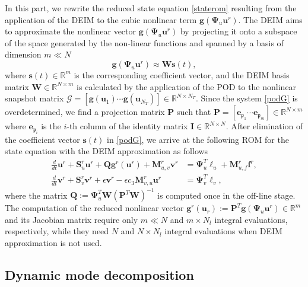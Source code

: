 \documentclass[preprint,12pt]{elsarticle}
\begin{document}
In this part, we rewrite the reduced state equation \eqref{staterom} resulting from the application of the DEIM \cite{chaturantabut10nmr} to the cubic nonlinear term $ \bm{g}(\bm{\Psi}_u \bm{u}^r)$.
The DEIM aims to approximate the nonlinear vector $ \bm{g}(\bm{\Psi}_u \bm{u}^r)$ by projecting it onto a subspace of the space generated by the non-linear functions and spanned by a basis of dimension $m\ll N$
\begin{equation}\label{podG}
 \bm{g}(\bm{\Psi}_u \bm{u}^r) \approx \bm{W}\bm{s}(t),
\end{equation}
where $\bm{s}(t)\in\mathbb{R}^m$ is the corresponding coefficient vector, and the DEIM basis matrix $\bm{W}\in\mathbb{R}^{N\times m}$ is calculated by the application of the POD to the nonlinear snapshot matrix $\mathcal{G}=[\bm{g}(\bm{u}_1) \cdots  \bm{g}(\bm{u}_{N_T})]\in\mathbb{R}^{N\times N_T}$. Since the system \eqref{podG} is overdetermined, we find a projection matrix $\bm{P}$ such that $\bm{P}=[\bm{e}_{\mathfrak{p}_1} \cdots  \bm{e}_{\mathfrak{p}_m}]\in\mathbb{R}^{N\times m}$ where $\bm{e}_{\mathfrak{p}_i}$ is the $i$-th column of the identity matrix $\bm{I}\in\mathbb{R}^{N\times N}$. After elimination of the coefficient vector $\bm{s}(t)$ in \eqref{podG}, we arrive at the following ROM for the state equation with the DEIM approximation as follows
\begin{equation}\label{statedeim}
\begin{aligned}
  \frac{d}{dt} \bm{u}^r +  \bm{S}^r_u \bm{u}^r   + \bm{Q}\bm{g}^r(\bm{u}^r)
  + \bm{M}_{u,v}^r \bm{v}^r  &=  \bm{\Psi}_u^T \bm{\ell}_u + \bm{M}_{u,f}^r \bm{f}^r, \\
 \frac{d}{dt} \bm{v}^r +  \bm{S}^r_v \bm{v}^r  + \epsilon \bm{v}^r
- \epsilon c_3 \bm{M}^r_{v,u} \bm{u}^r &=  \bm{\Psi}_v^T \bm{\ell}_v,
\end{aligned}
\end{equation}
where the matrix $\bm{Q}:=\bm{\Psi}_u^T \bm{W}(\bm{P}^T\bm{W})^{-1}$ is computed once in the off-line stage. The computation of the  reduced nonlinear vector $\bm{g}^r(\bm{u}_r):= \bm{P}^T \bm{g}(\bm{\Psi}_u \bm{u}^r)\in\mathbb{R}^m$ and its Jacobian matrix require only $m\ll N$ and $m\times N_l$ integral evaluations, respectively, while they need $N$ and $N\times N_l$ integral evaluations when DEIM approximation is not used.


\subsection{Dynamic mode decomposition}
\label{dmd}
\end{document}
